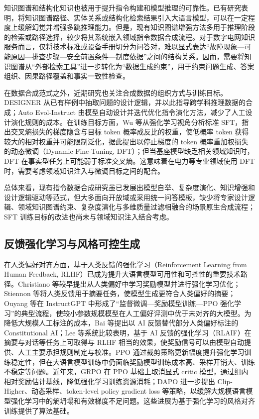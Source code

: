 \documentclass[fontset=fandol,type=master,campus=shenzhen,etitleauto=true]{hithesisbook}
\begin{document}
知识图谱和结构化知识也被用于提升指令构建和模型推理的可靠性。已有研究表明，将知识图谱路径、实体关系或结构化检索结果引入大语言模型，可以在一定程度上缓解幻觉并增强多跳推理能力\cite{ref15,ref16}。但是，现有知识图谱增强方法多用于推理阶段的检索或路径选择，较少将其系统嵌入领域指令数据合成流程。对于数字电网知识服务而言，仅将技术标准或设备手册切分为问答对，难以显式表达“故障现象—可能原因—排查步骤—安全前置条件—制度依据”之间的结构关系。因而，需要将知识图谱从“外部检索工具”进一步转化为“数据生成约束”，用于约束问题生成、答案组织、因果路径覆盖和事实一致性检查。

在数据合成范式之外，近期研究也关注合成数据的组织方式与训练目标。DESIGNER 从已有样例中抽取问题的设计逻辑，并以此指导跨学科推理数据的合成\cite{ref54}；Auto Evol-Instruct 由模型自动设计并迭代优化指令演化方法，减少了人工设计演化规则的成本\cite{ref53}。在训练目标方面，Wu 等从强化学习视角分析标准 SFT，指出交叉熵损失的梯度隐含与目标 token 概率成反比的权重，使低概率 token 获得较大的相对权重并可能限制泛化，据此提出以停止梯度的 token 概率重加权损失的动态微调（Dynamic Fine-Tuning, DFT）；但当基座模型缺乏相关领域知识时，DFT 在事实型任务上可能弱于标准交叉熵\cite{ref82}。这意味着在电力等专业领域使用 DFT 时，需要考虑领域知识注入与微调目标之间的配合。

总体来看，现有指令数据合成研究虽已发展出模型自举、复杂度演化、知识增强和设计逻辑驱动等范式，但大多面向开放域或采用统一问答模板，缺少将专家设计逻辑、领域知识图谱约束、复杂度演化与多维质量过滤相融合的场景原生合成流程；SFT 训练目标的改进也尚未与领域知识注入结合考虑。

\subsection{反馈强化学习与风格可控生成}

在人类偏好对齐方面，基于人类反馈的强化学习（Reinforcement Learning from Human Feedback, RLHF）已成为提升大语言模型可用性和可控性的重要技术路径。Christiano 等较早提出从人类偏好中学习奖励模型并进行强化学习优化\cite{ref30}；Stiennon 等将人类反馈用于摘要任务，使模型生成更符合人类偏好的摘要\cite{ref31}；Ouyang 等在 InstructGPT 中形成了“监督微调—奖励模型训练—PPO 强化学习”的典型流程，使较小参数规模模型在人工偏好评测中优于未对齐的大模型\cite{ref32}。为降低大规模人工标注的成本，Bai 等提出以 AI 反馈替代部分人类偏好标注的 Constitutional AI\cite{ref89}；Lee 等系统比较表明，基于 AI 反馈的强化学习（RLAIF）在摘要与对话等任务上可取得与 RLHF 相当的效果\cite{ref90}，使奖励信号可以由模型自动提供、人工主要承担规则制定与校准。PPO 通过裁剪策略更新幅度提升强化学习训练稳定性\cite{ref33}，但在大语言模型训练中仍面临奖励模型训练成本高、采样开销大、训练不稳定等问题。近年来，GRPO 在 PPO 基础上取消显式 critic 模型，通过组内相对奖励估计基线，降低强化学习训练资源消耗\cite{ref34}；DAPO 进一步提出 Clip-Higher、动态采样、token-level policy gradient loss 等策略，以缓解大规模语言模型强化学习中的熵坍塌和有效梯度不足问题\cite{ref35}。这些进展为基于强化学习的风格对齐训练提供了算法基础。
\end{document}
